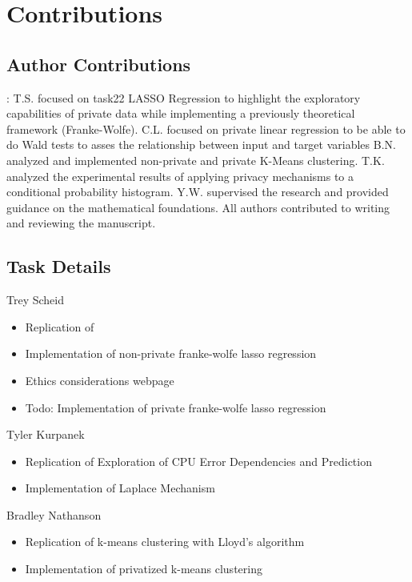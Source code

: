 \documentclass[12pt,letterpaper]{article}
\begin{document}
{%

\section{Contributions}

\subsection{Author Contributions}:
T.S. focused on task22 LASSO Regression to highlight the exploratory capabilities of private data while implementing a previously theoretical framework (Franke-Wolfe). C.L. focused on private linear regression to be able to do Wald tests to asses the relationship between input and target variables B.N. analyzed and implemented non-private and private K-Means clustering.  T.K. analyzed the experimental results of applying privacy mechanisms to a conditional probability histogram. Y.W. supervised the research and provided guidance on the mathematical foundations. All authors contributed to writing and reviewing the manuscript.

\subsection{Task Details}

Trey Scheid
\begin{itemize}
    \item Replication of 
    \item Implementation of non-private franke-wolfe lasso regression
    \item Ethics considerations webpage
    \item [ ] Todo: Implementation of private franke-wolfe lasso regression
\end{itemize}

Tyler Kurpanek
\begin{itemize}
    \item Replication of Exploration of CPU Error Dependencies and Prediction
    \item Implementation of Laplace Mechanism 
\end{itemize}

Bradley Nathanson
\begin{itemize}
    \item Replication of k-means clustering with Lloyd's algorithm
    \item Implementation of privatized k-means clustering
\end{itemize}

}
\end{document}
